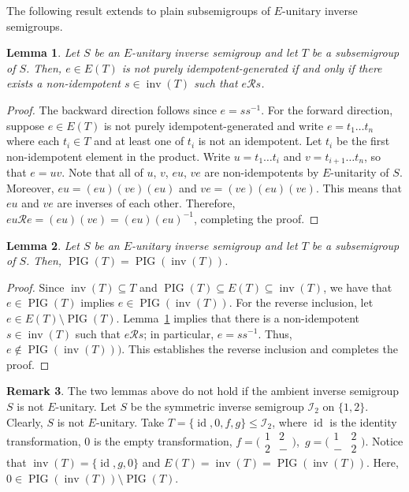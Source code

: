 \documentclass[reqno]{amsart}
\theoremstyle{plain}
\newtheorem{lem}{Lemma}[section]
\theoremstyle{definition}
\newtheorem{rmk}[lem]{Remark}
\DeclareMathOperator{\inv}{inv}
\DeclareMathOperator{\PIG}{PIG}
\DeclareMathOperator{\id}{id}
\numberwithin{equation}{section}
\begin{document}
The following result extends \cite[Proposition 1.1]{JonesTrotter} to plain subsemigroups of $E$-unitary inverse semigroups.


\begin{lem}
\label{lem:EuniPIGGreen}
Let $S$ be an $E$-unitary inverse semigroup and let $T$ be a subsemigroup of $S$.
Then, $e\in E(T)$ is not purely idempotent-generated if and only if there 
exists a non-idempotent $s\in \inv(T)$ such that $e\mathscr{R}s$.
\end{lem}
\begin{proof}
The backward direction follows since $e = ss^{-1}$.
For the forward direction, suppose $e\in E(T)$ is not purely idempotent-generated and write $e = t_1\dots t_n$ where each $t_i\in T$ and at least one of $t_i$ is not an idempotent. Let $t_i$ be the first non-idempotent element in the product. Write $u = t_1\dots t_i$ and $v = t_{i+1}\dots t_n$, so that $e = uv$. Note that all of $u$, $v$, $eu$, $ve$ are non-idempotents by $E$-unitarity of $S$. Moreover, $eu = (eu)(ve)(eu)$ and $ve = (ve)(eu)(ve)$. This means that $eu$ and $ve$ are inverses of each other. Therefore, $eu \mathscr{R} e = (eu)(ve) = (eu)(eu)^{-1}$, 
completing the proof.
\end{proof}

\begin{lem}
\label{lem:EuniPlainSamePIG}
Let $S$ be an $E$-unitary inverse semigroup and let $T$ be a subsemigroup of $S$. Then, $\PIG(T) = \PIG(\inv(T))$.
\end{lem}
\begin{proof}
Since $\inv(T)\subseteq T$ and $\PIG(T)\subseteq E(T)\subseteq \inv(T)$, we have that $e\in \PIG(T)$ implies $e\in \PIG(\inv(T))$. For the reverse inclusion, let $e\in E(T)\setminus\PIG(T)$. Lemma~\ref{lem:EuniPIGGreen} implies that there is a non-idempotent $s\in \inv(T)$ such that $e\mathscr{R}s$; in particular, $e = ss^{-1}$. Thus, $e\notin\PIG(\inv(T)))$. This establishes the reverse inclusion and completes the proof.
\end{proof}

\begin{rmk}
\label{rmk:NonEuni}
The two lemmas above do not hold if the ambient inverse semigroup $S$ is not $E$-unitary. Let $S$ be the symmetric inverse semigroup $\mathcal{I}_2$ on $\{1,2\}$. Clearly, $S$ is not $E$-unitary. 
Take $T = \{\id, 0,f,g\}\leq \mathcal{I}_2$, where $\id$ is the identity transformation, $0$ is the empty transformation,
$f = \bigl(\begin{smallmatrix}
		1 & 2 \\
		2 & -
	\end{smallmatrix}\bigr)$,\,
$g  = \bigl(\begin{smallmatrix}
		1 & 2\\
		- & 2
	\end{smallmatrix}\bigr)$.
Notice that $\inv(T) = \{\id, g, 0\}$ and $E(T) = \inv(T) = \PIG(\inv(T))$. Here, $0\in \PIG(\inv(T))\setminus \PIG(T)$.
\end{rmk}
\end{document}
